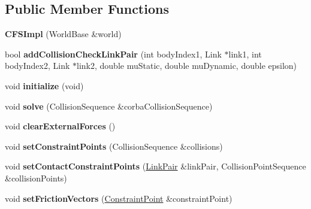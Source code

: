 \subsection*{Public Member Functions}
\begin{DoxyCompactItemize}
\item 
\hypertarget{classOpenHRP_1_1CFSImpl_ab15cb9dcbe5e7da7cb4403e6867ac2d6}{{\bfseries C\-F\-S\-Impl} (World\-Base \&world)}\label{classOpenHRP_1_1CFSImpl_ab15cb9dcbe5e7da7cb4403e6867ac2d6}

\item 
\hypertarget{classOpenHRP_1_1CFSImpl_aed4723e61cb05b92b09a1d6c9f2ae014}{bool {\bfseries add\-Collision\-Check\-Link\-Pair} (int body\-Index1, Link $\ast$link1, int body\-Index2, Link $\ast$link2, double mu\-Static, double mu\-Dynamic, double epsilon)}\label{classOpenHRP_1_1CFSImpl_aed4723e61cb05b92b09a1d6c9f2ae014}

\item 
\hypertarget{classOpenHRP_1_1CFSImpl_a31de0cb7f0b137ad3231e9fc09d35b6a}{void {\bfseries initialize} (void)}\label{classOpenHRP_1_1CFSImpl_a31de0cb7f0b137ad3231e9fc09d35b6a}

\item 
\hypertarget{classOpenHRP_1_1CFSImpl_a6143ef87d934c9b058ed7a0cc102d44a}{void {\bfseries solve} (Collision\-Sequence \&corba\-Collision\-Sequence)}\label{classOpenHRP_1_1CFSImpl_a6143ef87d934c9b058ed7a0cc102d44a}

\item 
\hypertarget{classOpenHRP_1_1CFSImpl_a2da7a64bfc892105b41fe6ade70707b1}{void {\bfseries clear\-External\-Forces} ()}\label{classOpenHRP_1_1CFSImpl_a2da7a64bfc892105b41fe6ade70707b1}

\item 
\hypertarget{classOpenHRP_1_1CFSImpl_a6d85970aa32d8b487ff1bd41c574d337}{void {\bfseries set\-Constraint\-Points} (Collision\-Sequence \&collisions)}\label{classOpenHRP_1_1CFSImpl_a6d85970aa32d8b487ff1bd41c574d337}

\item 
\hypertarget{classOpenHRP_1_1CFSImpl_a34a30a89f9d9717c471c78dbec4a86c0}{void {\bfseries set\-Contact\-Constraint\-Points} (\hyperlink{structOpenHRP_1_1CFSImpl_1_1LinkPair}{Link\-Pair} \&link\-Pair, Collision\-Point\-Sequence \&collision\-Points)}\label{classOpenHRP_1_1CFSImpl_a34a30a89f9d9717c471c78dbec4a86c0}

\item 
\hypertarget{classOpenHRP_1_1CFSImpl_a46e885522aad9b7792d0bb2e8e5f0f09}{void {\bfseries set\-Friction\-Vectors} (\hyperlink{structOpenHRP_1_1CFSImpl_1_1ConstraintPoint}{Constraint\-Point} \&constraint\-Point)}\label{classOpenHRP_1_1CFSImpl_a46e885522aad9b7792d0bb2e8e5f0f09}


\end{DoxyCompactItemize}
